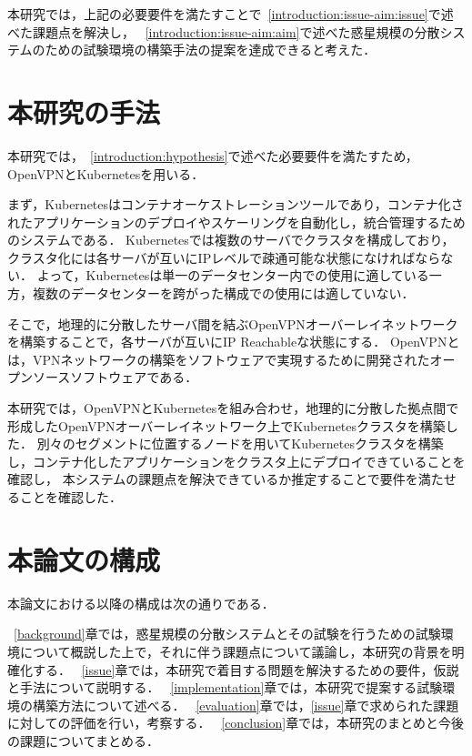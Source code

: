 本研究では，上記の必要要件を満たすことで~\ref{introduction:issue-aim:issue}で述べた課題点を解決し，
~\ref{introduction:issue-aim:aim}で述べた惑星規模の分散システムのための試験環境の構築手法の提案を達成できると考えた．

\section{本研究の手法}
\label{introduction:proposal}

本研究では，~\ref{introduction:hypothesis}で述べた必要要件を満たすため，OpenVPNとKubernetesを用いる．

まず，Kubernetesはコンテナオーケストレーションツールであり，コンテナ化されたアプリケーションのデプロイやスケーリングを自動化し，統合管理するためのシステムである．
Kubernetesでは複数のサーバでクラスタを構成しており，クラスタ化には各サーバが互いにIPレベルで疎通可能な状態になければならない．
よって，Kubernetesは単一のデータセンター内での使用に適している一方，複数のデータセンターを跨がった構成での使用には適していない．

そこで，地理的に分散したサーバ間を結ぶOpenVPNオーバーレイネットワークを構築することで，各サーバが互いにIP Reachableな状態にする．
OpenVPNとは，VPNネットワークの構築をソフトウェアで実現するために開発されたオープンソースソフトウェアである．

本研究では，OpenVPNとKubernetesを組み合わせ，地理的に分散した拠点間で形成したOpenVPNオーバーレイネットワーク上でKubernetesクラスタを構築した．
別々のセグメントに位置するノードを用いてKubernetesクラスタを構築し，コンテナ化したアプリケーションをクラスタ上にデプロイできていることを確認し，
本システムの課題点を解決できているか推定することで要件を満たせることを確認した．

\section{本論文の構成}
\label{introduction:structure}

本論文における以降の構成は次の通りである．

~\ref{background}章では，惑星規模の分散システムとその試験を行うための試験環境について概説した上で，それに伴う課題点について議論し，本研究の背景を明確化する．
~\ref{issue}章では，本研究で着目する問題を解決するための要件，仮説と手法について説明する．
~\ref{implementation}章では，本研究で提案する試験環境の構築方法について述べる．
~\ref{evaluation}章では，\ref{issue}章で求められた課題に対しての評価を行い，考察する．
~\ref{conclusion}章では，本研究のまとめと今後の課題についてまとめる．

